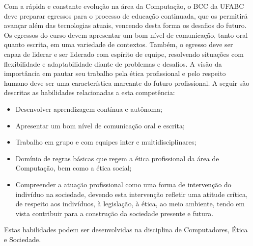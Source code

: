\begin{enumerate}
    Com a rápida e constante evolução na área da Computação, o BCC da UFABC
    deve preparar egressos para o processo de educação continuada, que os
    permitirá avançar além das tecnologias atuais, vencendo desta forma os
    desafios do futuro.
    Os egressos do curso devem apresentar um bom nível de comunicação, tanto
    oral quanto escrita, em uma variedade de contextos.
    Também, o egresso deve ser capaz de liderar e ser liderado com espírito de
    equipe, resolvendo situações com flexibilidade e adaptabilidade diante de
    problemas e desafios.
    A visão da importância em pautar seu trabalho pela ética profissional e
    pelo respeito humano deve ser uma característica marcante do futuro
    profissional.
    A seguir são descritas as habilidades relacionadas a esta competência:
    \begin{itemize}
        \item Desenvolver aprendizagem contínua e autônoma;
        \item Apresentar um bom nível de comunicação oral e escrita;
        \item Trabalho em grupo e com equipes inter e multidisciplinares;
        \item Domínio de regras básicas que regem a ética profissional da área
        de Computação, bem como a ética social;
        \item Compreender a atuação profissional como uma forma de intervenção
        do indivíduo na sociedade, devendo esta intervenção refletir uma
        atitude crítica, de respeito aos indivíduos, à legislação, à ética, ao
        meio ambiente, tendo em vista contribuir para a construção da sociedade
        presente e futura.
    \end{itemize}

    Estas habilidades podem ser desenvolvidas na disciplina de Computadores,
    Ética e Sociedade.
\end{enumerate}
